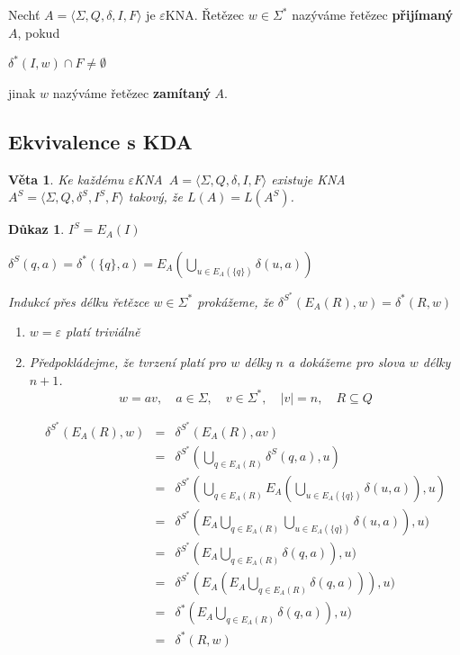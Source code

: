 \documentclass[10pt, a4paper, titlepage]{article}
\theoremstyle{note}
\newtheorem{veta}{\textbf{Věta}}
\newtheorem{dukaz}{\textbf{Důkaz}}
\newcommand{\ekna}{$\varepsilon$KNA} %
\begin{document}
Nechť $A=\langle\Sigma,Q,\delta,I,F\rangle$ je \ekna. Řetězec $w \in \Sigma^*$ nazýváme řetězec \textbf{přijímaný} $A$, pokud

$\delta^*(I,w) \cap F \neq \emptyset$

jinak $w$ nazýváme řetězec \textbf{zamítaný} $A$.

\subsection{Ekvivalence s KDA}

\begin{veta}
Ke každému \ekna \ $A=\langle\Sigma,Q,\delta,I,F\rangle$ existuje KNA $A^S=\langle\Sigma,Q,\delta^S,I^S,F\rangle$ takový, že $L(A)=L(A^S)$.
\end{veta}
 
 \begin{dukaz}
 $I^S=E_A(I)$
 
 $\delta^S(q,a)=\delta^*(\lbrace q \rbrace , a)= E_A(\bigcup_{u \in E_A(\lbrace q \rbrace )} \delta(u,a))$ 
 
 Indukcí přes délku řetězce $w \in \Sigma^*$ prokážeme, že $ \delta^{S^*} (E_A(R),w)=\delta^*(R,w)$
 
 \begin{enumerate}
 \item
 $w=\varepsilon$ platí triviálně
 \item
 Předpokládejme, že tvrzení platí pro $w$ délky $n$ a dokážeme pro slova $w$ délky $n+1$.
$$
w = av, \quad a \in \Sigma, \quad v \in \Sigma^*, \quad |v|=n, \quad R \subseteq Q
$$ 
 
 \begin{eqnarray*}
	\delta^{S^*} (E_A(R),w) &=& \delta^{S^*} (E_A(R),av) \\
	&=& \delta^{S^*} (\bigcup_{q \in E_A(R)} \delta^S(q,a), u) \\
	&=& \delta^{S^*} (\bigcup_{q \in E_A(R)} E_A(\bigcup_{u \in E_A(\lbrace q \rbrace)} \delta (u,a)),u) \\
	&=& \delta^{S^*} (E_{A} \bigcup_{q \in E_A(R)} \bigcup_{u \in E_A(\lbrace q \rbrace)} \delta (u,a)),u) \\
	&=& \delta^{S^*} (E_{A} \bigcup_{q \in E_A(R)} \delta (q,a)),u) \\
	&=& \delta^{S^*} (E_{A} (E_{A} \bigcup_{q \in E_A(R)} \delta (q,a))),u) \\
	&=& \delta^{*} (E_{A} \bigcup_{q \in E_A(R)} \delta (q,a)),u) \\
	&=& \delta^{*} (R, w)
 \end{eqnarray*}
 \end{enumerate} 
 \end{dukaz}
\end{document}
